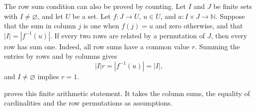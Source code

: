 The row sum condition can also be proved by counting. Let $I$ and $J$
be finite sets with $I\ne\varnothing$, and let $U$ be a set.
Let $f:J\to U$, $u\in U$, and $a:I\times J\to\mathbb N$. Suppose that the sum in column $j$ is
one when $f(j)=u$ and zero otherwise, and that $|I|=|f^{-1}(u)|$.
If every two rows are related by a permutation of $J$, then every row
has sum one. Indeed, all row sums have a common value $r$. Summing
the entries by rows and by columns gives
\[
 |I|r=|f^{-1}(u)|=|I|,
\]
and $I\ne\varnothing$ implies $r=1$.

\begin{implementation}
 proves this
finite arithmetic statement. It takes the column sums, the equality
of cardinalities and the row permutations as assumptions.
\end{implementation}
